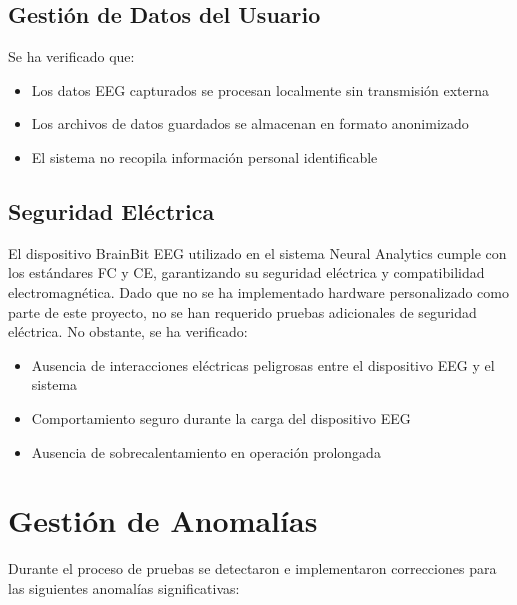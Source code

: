 \subsection{Gestión de Datos del Usuario}

Se ha verificado que:

\begin{itemize}
    \item Los datos EEG capturados se procesan localmente sin transmisión externa
    \item Los archivos de datos guardados se almacenan en formato anonimizado
    \item El sistema no recopila información personal identificable
\end{itemize}

\subsection{Seguridad Eléctrica}

El dispositivo BrainBit EEG utilizado en el sistema Neural Analytics cumple con los estándares FC y CE, garantizando su seguridad eléctrica y compatibilidad electromagnética. Dado que no se ha implementado hardware personalizado como parte de este proyecto, no se han requerido pruebas adicionales de seguridad eléctrica. No obstante, se ha verificado:

\begin{itemize}
    \item Ausencia de interacciones eléctricas peligrosas entre el dispositivo EEG y el sistema
    \item Comportamiento seguro durante la carga del dispositivo EEG
    \item Ausencia de sobrecalentamiento en operación prolongada
\end{itemize}

\section{Gestión de Anomalías}

Durante el proceso de pruebas se detectaron e implementaron correcciones para las siguientes anomalías significativas:

